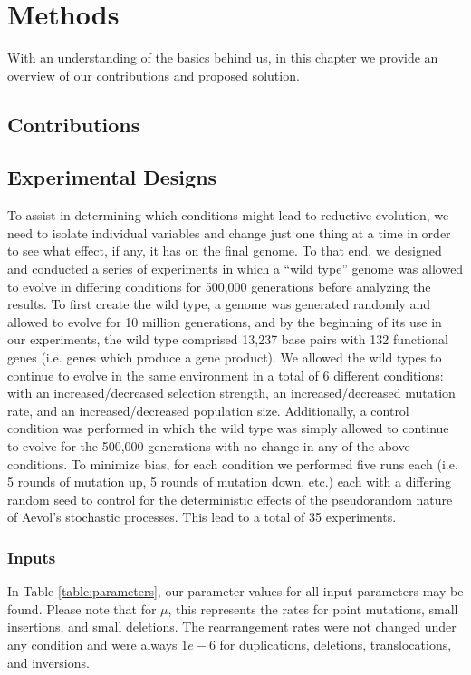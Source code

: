 \chapter{Methods}\label{ch:methods}
With an understanding of the basics behind us, in this chapter we provide an overview of our contributions and proposed solution.

\section{Contributions}

\section{Experimental Designs} \label{experimental_design}
To assist in determining which conditions might lead to reductive evolution, we need to isolate individual variables and change just one thing at a time in order to see what effect, if any, it has on the final genome. To that end, we designed and conducted a series of experiments in which a ``wild type'' genome was allowed to evolve in differing conditions for 500,000 generations before analyzing the results. To first create the wild type, a genome was generated randomly and allowed to evolve for 10 million generations, %
and by the beginning of its use in our experiments, the wild type comprised 13,237 base pairs with 132 functional genes (i.e. genes which produce a gene product). We allowed the wild types to continue to evolve in the same environment in a total of 6 different conditions: with an increased/decreased selection strength, an increased/decreased mutation rate, and an increased/decreased population size. Additionally, a control condition was performed in which the wild type was simply allowed to continue to evolve for the 500,000 generations with no change in any of the above conditions. To minimize bias, for each condition we performed five runs each (i.e. 5 rounds of mutation up, 5 rounds of mutation down, etc.) each with a differing random seed to control for the deterministic effects of the pseudorandom nature of Aevol's stochastic processes. This lead to a total of 35 experiments. 

\subsection{Inputs}
In Table \ref{table:parameters}, our parameter values for all input parameters may be found. Please note that for $\mu$, this represents the rates for point mutations, small insertions, and small deletions. The rearrangement rates were not changed under any condition and were always $1e-6$ for duplications, deletions, translocations, and inversions. 


